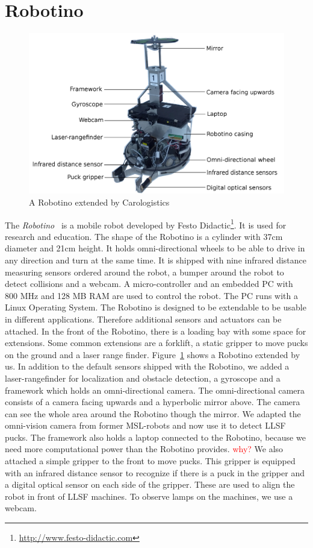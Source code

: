 \section{Robotino}
\label{sec:robotino}
\begin{figure}
\includegraphics[scale=0.11]{pics/carologistics_robotino}
\caption{A Robotino extended by Carologistics}
\label{fig:caro_robotino}
\end{figure}
The \textit{Robotino}~\cite{Robotino} is a mobile robot developed by Festo Didactic\footnote{\url{http://www.festo-didactic.com}}. It is used for research and education. The shape of the Robotino is a cylinder with 37cm diameter and 21cm height. It holds omni-directional wheels to be able to drive in any direction and turn at the same time. It is shipped with nine infrared distance measuring sensors ordered around the robot, a bumper around the robot to detect collisions and a webcam. A micro-controller and an embedded PC with 800 MHz and 128 MB RAM are used to control the robot. The PC runs with a Linux Operating System. The Robotino is designed to be extendable to be usable in different applications. Therefore additional sensors and actuators can be attached. In the front of the Robotino, there is a loading bay with some space for extensions. Some common extensions are a forklift, a static gripper to move pucks on the ground and a laser range finder. Figure~\ref{fig:caro_robotino} shows a Robotino extended by us. In addition to the default sensors shipped with the Robotino, we added a laser-rangefinder for localization and obstacle detection, a gyroscope and a framework which holds an omni-directional camera. The omni-directional camera consists of a camera facing upwards and a hyperbolic mirror above. The camera can see the whole area around the Robotino though the mirror. We adapted the omni-vision camera from former MSL-robots and now use it to detect LLSF pucks. The framework also holds a laptop connected to the Robotino, because we need more computational power than the Robotino provides. \textcolor{red}{why?} We also attached a simple gripper to the front to move pucks. This gripper is equipped with an infrared distance sensor to recognize if there is a puck in the gripper and a digital optical sensor on each side of the gripper. These are used to align the robot in front of LLSF machines. To observe lamps on the machines, we use a webcam.\\


